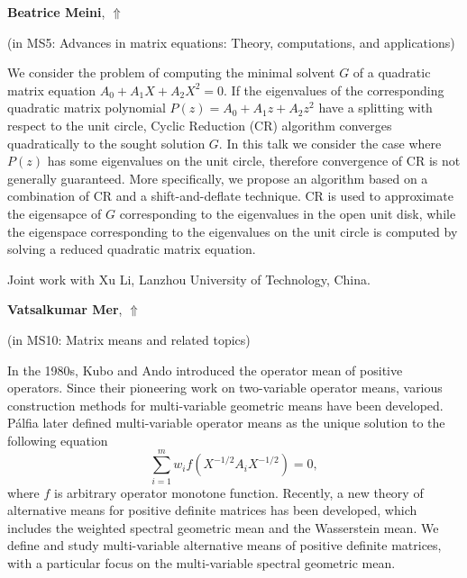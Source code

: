 \documentclass[ILAS2025-program.tex]{subfiles}
\begin{document}
\hypertarget{down0064}{}\begin{ilasabstract}
    
\textbf{Beatrice Meini},  \hfill \hyperlink{up0064}{$\Uparrow$}
    
    
(in {\color{mstitle}MS5: Advances in matrix equations: Theory, computations, and applications})
        
\mtskip
    We consider the problem of computing the minimal solvent $G$ of a quadratic matrix equation $A_0+A_1X+A_2X^2=0$.  If the eigenvalues of the corresponding quadratic matrix polynomial $P(z)=A_0+A_1z+A_2z^2$ have a splitting with respect to the unit circle, Cyclic Reduction (CR) algorithm converges quadratically to the sought solution $G$.
In this talk we consider the case where $P(z)$ has some eigenvalues on the unit circle, therefore convergence of CR is not generally guaranteed. 
More specifically, we propose an algorithm based on a combination of CR and a shift-and-deflate technique. CR is used to approximate the eigensapce of $G$ corresponding to the eigenvalues in the open unit disk, while the eigenspace corresponding to the eigenvalues on the unit circle is computed by solving a reduced quadratic matrix equation.


\smallskip\noindent
Joint work with Xu Li, Lanzhou University of Technology, China.

\end{ilasabstract}
    

\hypertarget{down0056}{}\begin{ilasabstract}
    
\textbf{Vatsalkumar Mer},  \hfill \hyperlink{up0056}{$\Uparrow$}
    
    
(in {\color{mstitle}MS10: Matrix means and related topics})
        
\mtskip
    In the 1980s, Kubo and Ando introduced the operator mean of positive operators. Since
their pioneering work on two-variable operator means, various construction methods for multi-variable geometric means have been developed. P\'alfia later defined multi-variable operator means as the unique solution to the following equation \begin{equation*}\label{E:Karcher f}
\sum_{i=1}^{m} w_{i} f( X^{-1/2} A_{i} X^{-1/2} )= 0,
\end{equation*}
where $f$ is  arbitrary operator monotone function.
Recently, a new theory of alternative means for positive definite matrices has been developed, which includes the weighted spectral geometric mean and the Wasserstein mean. We define and study multi-variable alternative means of positive
definite matrices, with a particular focus on the multi-variable spectral geometric mean.

\end{ilasabstract}
    
\end{document}
